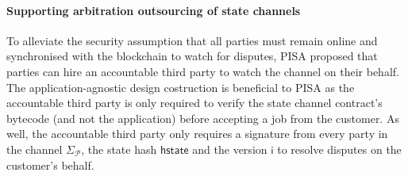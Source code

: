 \documentclass{llncs}
\newcommand{\hstate}{\mathsf{hstate}}
\newcommand{\monotoniccounter}{\mathsf{i}}
\newcommand{\participant}{\mathcal{P}}
\newcommand{\timerchallenge}{\mathsf{\Delta}_{\mathsf{challenge}}}
\newcommand{\timechallenge}{\mathsf{t}_{\mathsf{challenge}}}
\newcommand{\timerextra}{\mathsf{\Delta}_{\mathsf{extra}}}
\newcommand{\timerdispute}{\mathsf{\Delta}_{\mathsf{dispute}}}
\begin{document}


\paragraph{Supporting arbitration outsourcing of state channels} 
To alleviate the security assumption that all parties must remain online and synchronised with the blockchain to watch for disputes, PISA \cite{mccorry2018pisa} proposed that parties can hire an accountable third party to watch the channel on their behalf. 
The application-agnostic design costruction is beneficial to PISA as the accountable third party is only required to verify the state channel contract's bytecode (and not the application) before accepting a job from the customer. 
As well,  the accountable third party only requires a signature from every party in the channel $\Sigma_{\participant}$, the state hash $\hstate$ and the version $\monotoniccounter$ to resolve disputes on the customer's behalf. 
\end{document}
